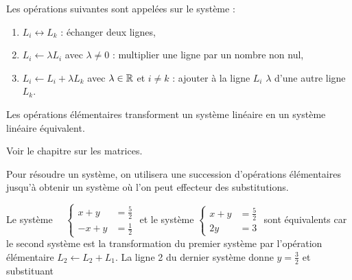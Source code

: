 \documentclass[a4paper]{book}
\begin{document}
\begin{Definition}
Les opérations suivantes sont appelées  sur le système :
\begin{enumerate}
\item  $L_i\leftrightarrow L_k$ : échanger deux lignes,
\item  $L_i\leftarrow \lambda L_i$ avec $\lambda\neq 0$ : multiplier une ligne par un nombre non nul, 
\item  $L_i \leftarrow  L_i +\lambda L_k$ avec $\lambda\in\mathbb{R}$ et $i\neq k$ : ajouter à la ligne $L_i$ $\lambda$ d'une autre ligne $L_k$.
\end{enumerate}
\end{Definition}

\begin{Proposition}
Les opérations élémentaires transforment un système linéaire en un système linéaire équivalent.
\end{Proposition}
\begin{Demonstration}
Voir le chapitre sur les matrices.
\end{Demonstration}
\begin{Remarque}
Pour résoudre un système, on utilisera une succession d'opérations élémentaires jusqu'à obtenir un système où l'on peut effecteur des substitutions.    
\end{Remarque}
\begin{Exemple}
Le système 
$\quad \begin{cases}
x+y&=\frac 5 2\\
-x+y&=\frac 1 2
\end{cases}
$
et le système 
$\begin{cases}
x+y&=\frac 5 2\\
2y&=3
\end{cases}
$ sont équivalents car le second système est la transformation du premier système par l'opération élémentaire $L_2\leftarrow L_2+L_1$. La ligne 2 du dernier système donne $y=\frac 3 2$ et substituant 
\end{Exemple}
\end{document}
